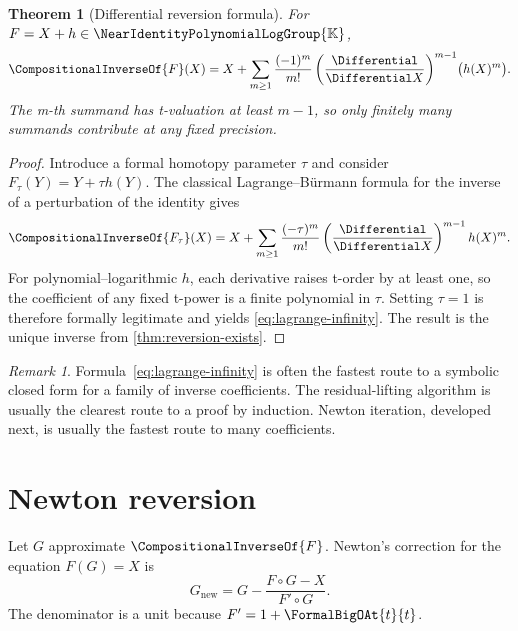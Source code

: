 \documentclass[11pt,openany]{book}
\theoremstyle{definition}
\theoremstyle{plain}
\newtheorem{theorem}{Theorem}[chapter]
\theoremstyle{remark}
\newtheorem{remark}{Remark}[chapter]
\newcommand{\K}{\mathbb{K}}
\newcommand{\rev}[1]{\CompositionalInverseOf{#1}}
\newcommand{\compose}{\mathbin{\circ}}
\begin{document}
\begin{theorem}[Differential reversion formula]\label{thm:lagrange-infinity}
For \(F=X+h\in\NearIdentityPolynomialLogGroup{\K}\),
\begin{equation}\label{eq:lagrange-infinity}
 \rev{F}(X)
 =X+\sum_{m\ge1}\frac{(-1)^m}{m!}
 \left(\frac{\Differential}{\Differential X}\right)^{m-1}\!\bigl(h(X)^m\bigr).
\end{equation}
The m-th summand has t-valuation at least \(m-1\), so only finitely many
summands contribute at any fixed precision.
\end{theorem}
\begin{proof}
Introduce a formal homotopy parameter \(\tau\) and consider
\(F_\tau(Y)=Y+\tau h(Y)\).  The classical Lagrange--Bürmann formula for the inverse
of a perturbation of the identity gives
\[
 \CompositionalInverseOf{F_\tau}(X)
 =X+\sum_{m\ge1}\frac{(-\tau)^m}{m!}
 \left(\frac{\Differential}{\Differential X}\right)^{m-1}h(X)^m.
\]
For polynomial--logarithmic \(h\), each derivative raises t-order by at least
one, so the coefficient of any fixed t-power is a finite polynomial in \(\tau\).
Setting \(\tau=1\) is therefore formally legitimate and yields
\cref{eq:lagrange-infinity}.  The result is the unique inverse from
\cref{thm:reversion-exists}.
\end{proof}

\begin{remark}
Formula~\eqref{eq:lagrange-infinity} is often the fastest route to a symbolic
closed form for a family of inverse coefficients.  The residual-lifting
algorithm is usually the clearest route to a proof by induction.  Newton
iteration, developed next, is usually the fastest route to many coefficients.
\end{remark}

\section{Newton reversion}
Let \(G\) approximate \(\rev{F}\).  Newton's correction for the equation
\(F(G)=X\) is
\begin{equation}\label{eq:newton-reversion}
 G_{\mathrm{new}}
 =G-\frac{F\compose G-X}{F'\compose G}.
\end{equation}
The denominator is a unit because \(F'=1+\FormalBigOAt{t}{t}\).
\end{document}
